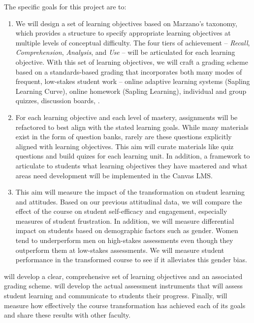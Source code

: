 \documentclass[10pt,letterpaper]{article}
\begin{document}
The specific goals for this project are to:
\begin{enumerate}[nosep,label=\textbf{\arabic*}.]
\item {} 
We will design a set of learning objectives  based on Marzano's taxonomy, which provides a structure to specify appropriate learning objectives at multiple levels of conceptual difficulty. The four tiers of achievement -- \textit{Recall}, \textit{Comprehension}, \textit{Analysis}, and \textit{Use} -- will be articulated for each learning objective. With this set of learning objectives, we will craft a grading scheme based on a standards-based grading that incorporates both many modes of frequent, low-stakes student work -- online adaptive learning systems (Sapling Learning Curve), online homework (Sapling Learning), individual and group quizzes, discussion boards, .

\item {}
For each learning objective and each level of mastery, assignments will be refactored to best align with the stated learning goals. While many materials exist in the form of question banks, rarely are these questions explicitly aligned with learning objectives. This aim will curate materials like quiz questions and build quizes for each learning unit. In addition,  a framework to articulate to students what learning objectives they have mastered and what areas need development will be implemented in the Canvas LMS.

\item {}
This aim will measure the impact of the transformation on student learning and attitudes. Based on our previous attitudinal data, we will compare the effect of the course on student self-efficacy and engagement, especially measures of student frustration. In addition, we will measure differential impact on students based on demographic factors such as gender. Women tend to underperform men on high-stakes assessments even though they outperform them at low-stakes assessments. We will measure student performance in the transformed course to see if it alleviates this gender bias.
\end{enumerate}
 will develop a clear, comprehensive set of learning objectives and an associated grading scheme. 
 will develop the actual assessment instruments that will assess student learning and communicate to students their progress. Finally,  will measure how effectively the course transformation has achieved each of its goals and share these results with other faculty.
\end{document}
